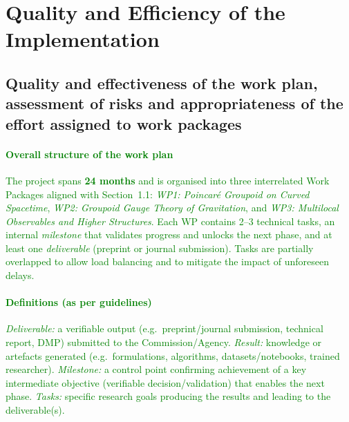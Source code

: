 \documentclass[11pt,draftproposal]{msca-pf}
\begin{document}
 


\section{Quality and Efficiency of the Implementation
            }
\label{sc:implementation}



\subsection{Quality and effectiveness of the work plan, assessment of risks and
    appropriateness of the effort assigned to work packages}
\label{ssc:implementation:workplan}

\paragraph{\textcolor{green}{Overall structure of the work plan}}
\textcolor{green}{The project spans \textbf{24 months} and is organised into three interrelated Work Packages aligned with Section~1.1: 
\emph{WP1: Poincaré Groupoid on Curved Spacetime}, 
\emph{WP2: Groupoid Gauge Theory of Gravitation}, and 
\emph{WP3: Multilocal Observables and Higher Structures}. 
Each WP contains 2--3 technical tasks, an internal \emph{milestone} that validates progress and unlocks the next phase, and at least one \emph{deliverable} (preprint or journal submission). 
Tasks are partially overlapped to allow load balancing and to mitigate the impact of unforeseen delays.}

\paragraph{\textcolor{green}{Definitions (as per guidelines)}}
\textcolor{green}{\emph{Deliverable:} a verifiable output (e.g.\ preprint/journal submission, technical report, DMP) submitted to the Commission/Agency. 
\emph{Result:} knowledge or artefacts generated (e.g.\ formulations, algorithms, datasets/notebooks, trained researcher). 
\emph{Milestone:} a control point confirming achievement of a key intermediate objective (verifiable decision/validation) that enables the next phase. 
\emph{Tasks:} specific research goals producing the results and leading to the deliverable(s).}
\end{document}
